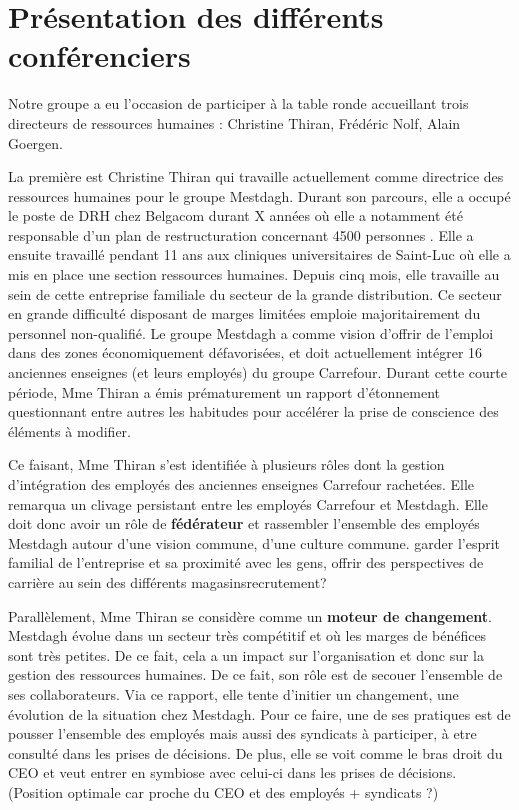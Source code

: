 \documentclass[a4paper, 12pt]{article}
\begin{document}


\section{Présentation des différents conférenciers}
Notre groupe a eu l'occasion de participer à la table ronde accueillant trois directeurs de ressources humaines : Christine Thiran, Frédéric Nolf, Alain Goergen.

La première est Christine Thiran qui travaille actuellement comme directrice des ressources humaines pour le groupe Mestdagh. Durant son parcours, elle a occupé le poste de DRH chez Belgacom  durant X années  où elle a notamment été responsable d'un plan de restructuration concernant 4500 personnes \cite{planBEST}. Elle a ensuite travaillé pendant 11 ans aux cliniques universitaires de Saint-Luc où elle a mis en place une section ressources humaines. Depuis cinq mois, elle travaille au sein de cette entreprise familiale du secteur de la grande distribution. Ce secteur en grande difficulté disposant de marges limitées emploie majoritairement du personnel non-qualifié. Le groupe Mestdagh a comme vision d'offrir de l'emploi dans des zones économiquement défavorisées, et doit actuellement intégrer 16 anciennes enseignes (et leurs employés) du groupe Carrefour. Durant cette courte période, Mme Thiran a émis prématurement un rapport d'étonnement questionnant entre autres les habitudes pour accélérer la prise de conscience des éléments à modifier.

Ce faisant, Mme Thiran s'est identifiée à plusieurs rôles dont la gestion d'intégration des employés des anciennes enseignes Carrefour rachetées. Elle remarqua un clivage persistant entre les employés Carrefour et Mestdagh. Elle doit donc avoir un rôle de \textbf{fédérateur} et rassembler l'ensemble des employés Mestdagh autour d'une vision commune, d'une culture commune.  garder l'esprit familial de l'entreprise et sa proximité avec les gens, offrir des perspectives de carrière au sein des différents magasins\newline  recrutement?


Parallèlement, Mme Thiran se considère comme un \textbf{moteur de changement}. Mestdagh évolue dans un secteur très compétitif et où les marges de bénéfices sont très petites. De ce fait, cela a un impact sur l'organisation et donc sur la gestion des ressources humaines. De ce fait, son rôle est de secouer l'ensemble de ses collaborateurs. Via ce rapport, elle tente d'initier un changement, une évolution de la situation chez Mestdagh. \newline
Pour ce faire, une de ses pratiques est de pousser l'ensemble des employés mais aussi des syndicats à participer, à etre consulté dans les prises de décisions. De plus, elle se voit comme le bras droit du CEO et veut entrer en symbiose avec celui-ci dans les prises de décisions. (Position optimale car proche du CEO et des employés + syndicats  ?)
\end{document}
